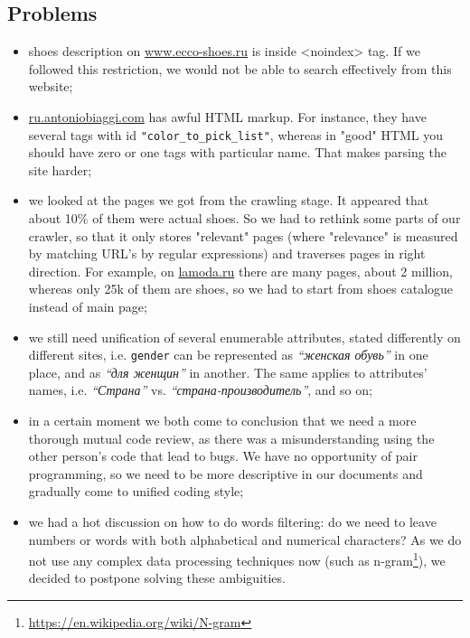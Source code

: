 \subsection{Problems}
\begin{itemize}
\item shoes description on \url{www.ecco-shoes.ru} is inside <noindex> tag. If we followed this restriction, 
we would not be able to search effectively from this website;

\item \url{ru.antoniobiaggi.com} has awful HTML markup. For in\-stance, they have several tags with 
id \newline \texttt{"color\_to\_pick\_list"}, whereas in "good" HTML you should have zero or one tags with particular name.
That makes parsing the site harder;

\item we looked at the pages we got from the crawling stage. It appeared that about 10\% of them were actual shoes.
So we had to rethink some parts of our crawler, so that it only stores "relevant" pages (where "relevance" is 
mea\-sured by matching URL's by regular expressions) and traverses pages in right direction. 
For example, on \url{lamoda.ru} there
are many pages, about 2 million, whereas only 25k of them are shoes, so we had to start from shoes catalogue instead
of main page;

\item we still need unification of several enumerable attributes, stated differently on different sites, 
i.e. \texttt{gender} can be represented as \textit{“женская обувь”} in one place, 
and as \textit{“для женщин”} in another. The same applies to attributes' names, i.e. \textit{“Страна”} vs. \textit{“страна-производитель”}, and so on;

\item in a certain moment we both come to conclusion that we need a more thorough mutual code review, 
as there was a misunderstanding using the other person's code that lead to bugs.
We have no opportunity of pair pro\-gram\-ming, 
so we need to be more descriptive in our documents and gradually come to unified coding style;

\item we had a hot discussion on how to do words filtering: 
do we need to leave numbers or words with both al\-pha\-bet\-i\-cal and numerical characters?
As we do not use any complex data processing techniques now (such as n-gram\footnote{\url{https://en.wikipedia.org/wiki/N-gram}}), 
we decided to postpone solving these ambiguities.
\end{itemize}
